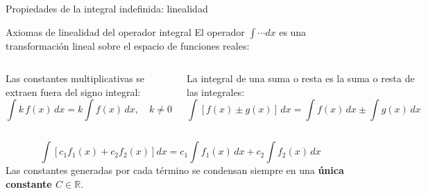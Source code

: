 \documentclass[aspectratio=169,11pt]{beamer}
\begin{document}
\begin{frame}{Propiedades de la integral indefinida: linealidad}
\footnotesize
\begin{block}{Axiomas de linealidad del operador integral}
\scriptsize
El operador $\int \cdots dx$ es una transformación lineal sobre el espacio de funciones reales:
\end{block}
\vspace{0.04cm}
\begin{columns}[T,onlytextwidth]
\begin{techbox}[title=1. Homogeneidad (Factor constante), top=3pt,bottom=3pt]
\scriptsize
Las constantes multiplicativas se extraen fuera del signo integral:
\[
\int k\,f(x)\,dx = k\int f(x)\,dx, \quad k\neq 0
\]
\end{techbox}
\begin{techbox}[title=2. Aditividad (Suma y resta), top=3pt,bottom=3pt]
\scriptsize
La integral de una suma o resta es la suma o resta de las integrales:
\[
\int [f(x)\pm g(x)]\,dx = \int f(x)\,dx \pm \int g(x)\,dx
\]
\end{techbox}
\end{columns}
\vspace{0.04cm}
\begin{keybox}[title=Linealidad global y constante única $C$, top=2pt,bottom=2pt]
\scriptsize
\[
\int \left[ c_1 f_1(x) + c_2 f_2(x) \right] dx = c_1\int f_1(x)\,dx + c_2\int f_2(x)\,dx
\]
Las constantes generadas por cada término se condensan siempre en una \textbf{única constante $C \in \mathbb{R}$}.
\end{keybox}
\end{frame}
\end{document}
